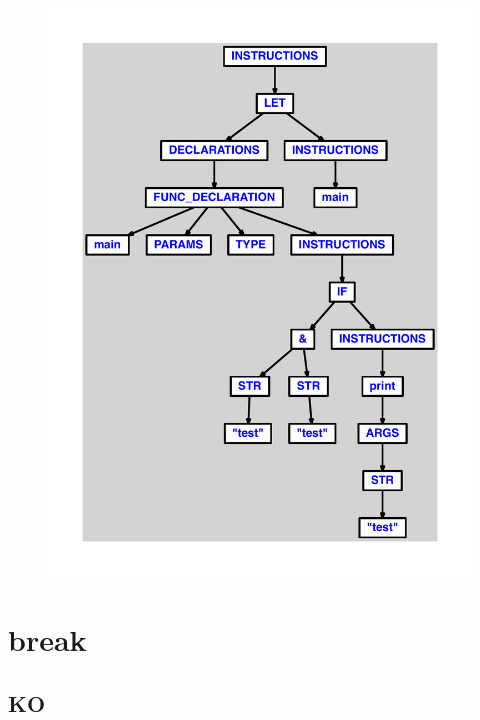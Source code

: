 \documentclass{article}
\begin{document}
\begin{figure}[H]\centering\includegraphics[max width=\textwidth]{ast/ast_6.pdf}\end{figure}\section{break}
\subsection{KO}
\end{document}
